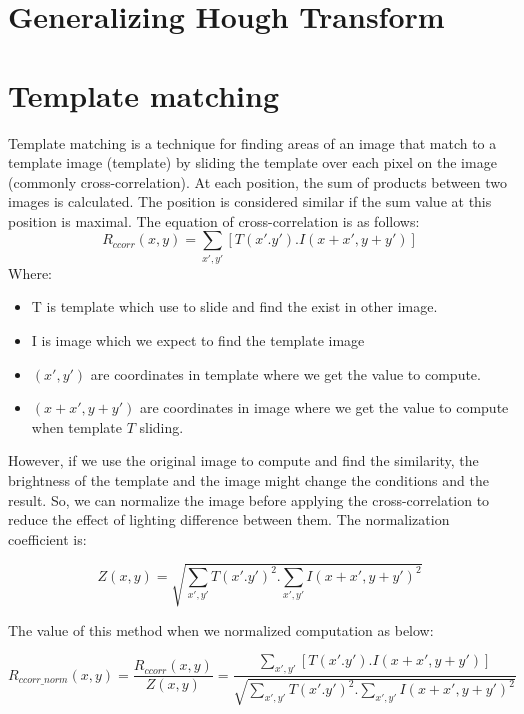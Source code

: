 \section{Generalizing Hough Transform}
\section{Template matching}
Template matching is a technique for finding areas of an image that match to a template image (template) by sliding the template over each pixel on the image (commonly cross-correlation). At each position, the sum of products between two images is calculated. The position is considered similar if the sum value at this position is maximal. The equation of cross-correlation is as follows:
\begin{equation}
\label{eq:cross-correlation}
	R_{ccorr}(x,y) = \sum\limits_{x',y'}[T(x'.y').I(x + x', y + y')]
\end{equation}
Where:
\begin{itemize}
\item T is template which use to slide and find the exist in other image.
\item I is image which we expect to find the template image
\item $(x', y')$ are coordinates in template where we get the value to compute.
\item $(x + x', y + y')$ are coordinates in image where we get the value to compute when template $T$ sliding.
\end{itemize}
However, if we use the original image to compute and find the similarity, the brightness of the template and the image might change the conditions and the result. So, we can normalize the image before applying the cross-correlation to reduce the effect of lighting difference between them. The normalization coefficient is:
\begin{center}
\begin{equation}\label{eq:normalizeCoff}
Z(x,y) = \sqrt{\sum\limits_{x',y'}T(x'.y')^{2}.\sum\limits_{x',y'}I(x + x', y + y')^{2}}
\end{equation}
\end{center}
The value of this method when we normalized computation as below:
\begin{center}
\begin{equation}\label{eq:cross-correlation}
R_{ccorr\_norm}(x,y) =\frac{R_{ccorr}(x,y)}{Z(x,y)} = \frac{\sum\limits_{x',y'}[T(x'.y').I(x + x', y + y')]}{\sqrt{\sum\limits_{x',y'}T(x'.y')^{2}.\sum\limits_{x',y'}I(x + x', y + y')^{2}}}
\end{equation}
\end{center}